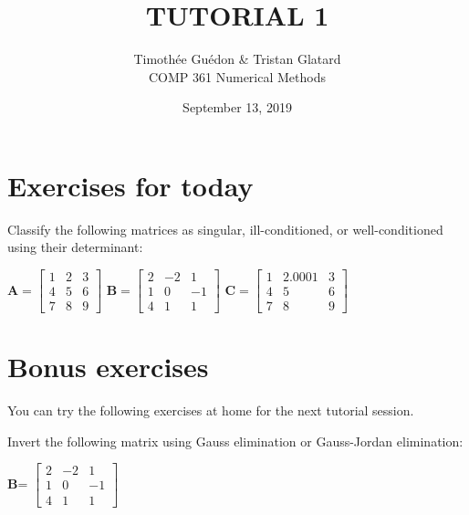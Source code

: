 \documentclass[12pt]{article}
\newenvironment{exercise}[2][Exercise]{\begin{trivlist}
\item[\hskip \labelsep {\bfseries #1}\hskip \labelsep {\bfseries #2.}]}{\end{trivlist}}
\begin{document}
\title{TUTORIAL 1}%
\author{Timothée Guédon \& Tristan Glatard\\ %
COMP 361 Numerical Methods} %
\date{September 13, 2019}
\maketitle

\section{Exercises for today}

\begin{exercise}{1} %
Classify the following matrices as singular, ill-conditioned, or well-conditioned using their determinant:\\
\begin{center}

$\textbf{A}=
\begin{bmatrix}
1&2&3 \\4&5&6 \\ 7&8&9
\end{bmatrix}$
$\textbf{B}=
\begin{bmatrix}
2&-2&1 \\1&0&-1 \\ 4&1&1
\end{bmatrix}$
$\textbf{C}=
\begin{bmatrix}
1&2.0001&3 \\4&5&6 \\ 7&8&9
\end{bmatrix}$
\end{center}

\end{exercise}

\section{Bonus exercises}

You can try the following exercises at home for the next tutorial session.

\begin{exercise}{2} %
Invert the following matrix using Gauss elimination or Gauss-Jordan elimination:
\begin{center}
\textbf{B}=
$\begin{bmatrix}
2&-2&1\\
1&0&-1\\
4&1&1
\end{bmatrix}
$
\end{center}
\end{exercise}
\end{document}

